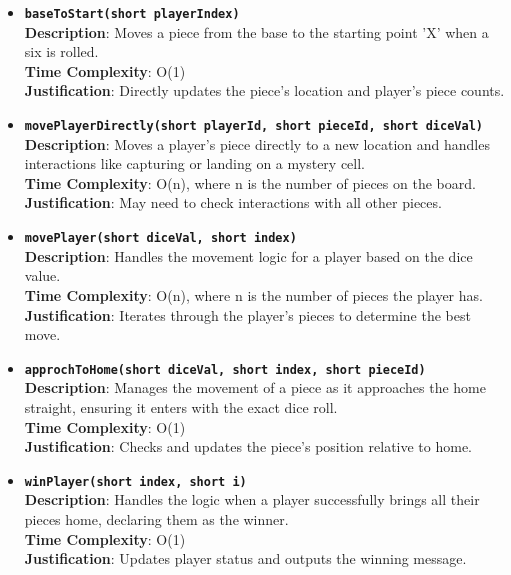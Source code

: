 \documentclass{article}
\begin{document}
        \begin{itemize}
            \item \textbf{\texttt{baseToStart(short playerIndex)}}\\
            \textbf{Description}: Moves a piece from the base to the starting point 'X' when a six is rolled.\\
            \textbf{Time Complexity}: O(1)\\
            \textbf{Justification}: Directly updates the piece’s location and player’s piece counts.
            
            \item \textbf{\texttt{movePlayerDirectly(short playerId, short pieceId, short diceVal)}}\\
            \textbf{Description}: Moves a player's piece directly to a new location and handles interactions like capturing or landing on a mystery cell.\\
            \textbf{Time Complexity}: O(n), where n is the number of pieces on the board.\\
            \textbf{Justification}: May need to check interactions with all other pieces.
            
            \item \textbf{\texttt{movePlayer(short diceVal, short index)}}\\
            \textbf{Description}: Handles the movement logic for a player based on the dice value.\\
            \textbf{Time Complexity}: O(n), where n is the number of pieces the player has.\\
            \textbf{Justification}: Iterates through the player's pieces to determine the best move.
            
            \item \textbf{\texttt{approchToHome(short diceVal, short index, short pieceId)}}\\
            \textbf{Description}: Manages the movement of a piece as it approaches the home straight, ensuring it enters with the exact dice roll.\\
            \textbf{Time Complexity}: O(1)\\
            \textbf{Justification}: Checks and updates the piece’s position relative to home.
            
            \item \textbf{\texttt{winPlayer(short index, short i)}}\\
            \textbf{Description}: Handles the logic when a player successfully brings all their pieces home, declaring them as the winner.\\
            \textbf{Time Complexity}: O(1)\\
            \textbf{Justification}: Updates player status and outputs the winning message.
        \end{itemize}
        
\end{document}

